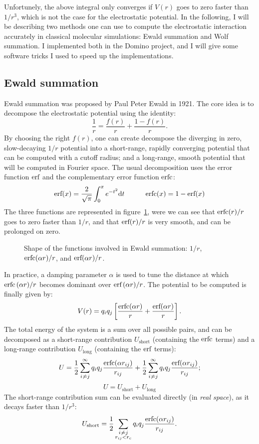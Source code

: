 \documentclass[thesis]{subfiles}
\begin{document}
Unfortunely, the above integral only converges if $V(r)$ goes to zero faster
than $1/r^3$, which is not the case for the electrostatic potential. In the
following, I will be describing two methods one can use to compute the
electrostatic interaction accurately in classical molecular simulations: Ewald
summation and Wolf summation. I implemented both in the Domino project, and I
will give some software tricks I used to speed up the implementations.

\subsection{Ewald summation}

Ewald summation was proposed by Paul Peter Ewald in 1921\cite{Ewald1921}. The
core idea is to decompose the electrostatic potential using the identity:
\[ \frac{1}{r} = \frac{f(r)}{r} + \frac{1 - f(r)}{r}. \]
By choosing the right $f(r)$, one can create decompose the diverging in zero,
slow-decaying $1/r$ potential into a short-range, rapidly converging potential
that can be computed with a cutoff radius; and a long-range, smooth potential
that will be computed in Fourier space. The usual decomposition uses the error
function ${\normalfont\text{erf}}$ and the complementary error function ${\normalfont\text{erfc}}$:
\[{\normalfont\text{erf}}(x) = \frac{2}{\sqrt\pi} \int_0^x e^{-t^2} \text{d} t \hskip3em {\normalfont\text{erfc}}(x) = 1 - {\normalfont\text{erf}}(x)\]
The three functions are represented in figure~\ref{fig:ewald:erf}, were we can
see that ${\normalfont\text{erfc}}(r)/r$ goes to zero faster than $1/r$, and that ${\normalfont\text{erf}}(r)/r$ is
very smooth, and can be prolonged on zero.

\begin{figure}[ht]
    \centering
    
    \caption{Shape of the functions involved in Ewald summation: $1/r$, ${\normalfont\text{erfc}}(\alpha r) / r$,
    and ${\normalfont\text{erf}}(\alpha r) / r$.}
    \label{fig:ewald:erf}
\end{figure}

In practice, a damping parameter $\alpha$ is used to tune the distance at which
${\normalfont\text{erfc}}\,(\alpha r) / r$ becomes dominant over ${\normalfont\text{erf}}\,(\alpha r) / r$. The
potential to be computed is finally given by:
\[ V(r) = q_i q_j \left[\frac{{\normalfont\text{erfc}}(\alpha r)}{r} + \frac{{\normalfont\text{erf}}(\alpha r)}{r} \right].\]
The total energy of the system is a sum over all possible pairs, and can be
decomposed as a short-range contribution $U_\text{short}$ (containing the
${\normalfont\text{erfc}}$ terms) and a long-range contribution $U_\text{long}$ (containing the
${\normalfont\text{erf}}$ terms):
\[ U = \frac12 \sum_{i\not\kern0.2ex= j}^\infty q_i q_j \frac{{\normalfont\text{erfc}}(\alpha r_{ij})}{r_{ij}} + \frac12 \sum_{i\not\kern0.2ex= j}^\infty q_i q_j \frac{{\normalfont\text{erf}}(\alpha r_{ij})}{r_{ij}};\]
\[ U = U_\text{short} + U_\text{long}\]
The short-range contribution sum can be evaluated directly (in \emph{real
space}), as it decays faster than $1/r^3$:
\[ U_\text{short} = \frac12 \sum_{\substack{i\not\kern0.2ex= j \\ r_{ij} < r_c}} q_i q_j \frac{{\normalfont\text{erfc}}(\alpha r_{ij})}{r_{ij}}.\]
\end{document}
